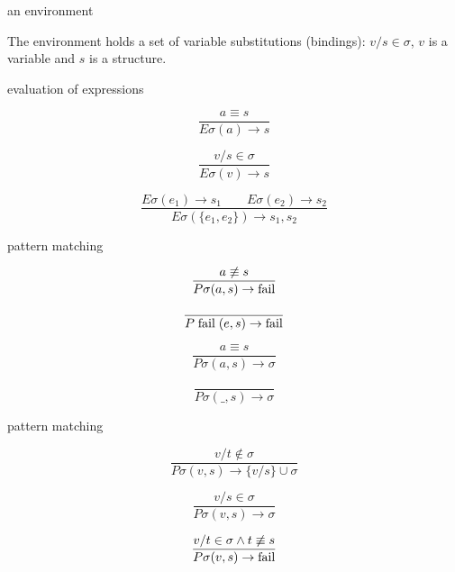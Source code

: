 \begin{frame}{an environment}

\pause\vspace{20pt}
The environment holds a set of variable substitutions (bindings):
$v/s \in \sigma$, $v$ is a variable and $s$ is a structure.


\end{frame}


\begin{frame}{evaluation of expressions}

\vspace{10pt}\pause $$\frac{a \equiv s}{E\sigma(a) \rightarrow s}$$

\vspace{10pt}\pause $$\frac{v/s \in \sigma}{E\sigma(v) \rightarrow s}$$

\vspace{10pt}\pause $$\frac{ E\sigma(e_1) \rightarrow s_1 \qquad   E\sigma(e_2) \rightarrow s_2}{E\sigma(\lbrace e_1 , e_2\rbrace) \rightarrow {s_1, s_2}}$$

\pause\vspace{20pt}{\em Evaluation can result in $\perp$, if a variable is unbound.}

\end{frame}

\begin{frame}{pattern matching}

  $$\frac{a \not\equiv s}{P\sigma(a, s) \rightarrow {\rm fail}}$$

  \vspace{20pt}\pause
  $$\frac{}{P\;{\rm fail}\;(e, s) \rightarrow {\rm fail}}$$

  \vspace{20pt}\pause

  $$\frac{a \equiv s}{P\sigma(a, s) \rightarrow \sigma}$$

  \vspace{20pt}\pause

  $$\frac{}{P\sigma(\_,s) \rightarrow \sigma}$$

\end{frame}

\begin{frame}{pattern matching}
  
  \vspace{20pt} \pause

  $$\frac{v/t \not\in \sigma}{P\sigma(v, s) \rightarrow \lbrace v/s \rbrace \cup \sigma}$$

  \vspace{20pt}\pause
  
  $$\frac{v/s \in \sigma}{P\sigma(v, s) \rightarrow \sigma}$$

  \vspace{20pt}\pause
  
  $$\frac{v/t \in \sigma \wedge t \not\equiv s}{P\sigma(v, s) \rightarrow {\rm fail} }$$ 
\end{frame}

